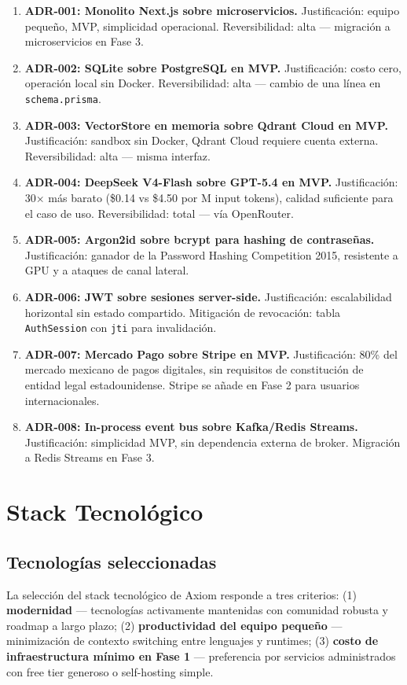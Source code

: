 \documentclass[10pt,a4paper,oneside]{report}
\begin{document}
\begin{enumerate}[leftmargin=1.6em]
\item \textbf{ADR-001: Monolito Next.js sobre microservicios.} Justificación: equipo pequeño, MVP, simplicidad operacional. Reversibilidad: alta — migración a microservicios en Fase 3.
\item \textbf{ADR-002: SQLite sobre PostgreSQL en MVP.} Justificación: costo cero, operación local sin Docker. Reversibilidad: alta — cambio de una línea en \texttt{schema.prisma}.
\item \textbf{ADR-003: VectorStore en memoria sobre Qdrant Cloud en MVP.} Justificación: sandbox sin Docker, Qdrant Cloud requiere cuenta externa. Reversibilidad: alta — misma interfaz.
\item \textbf{ADR-004: DeepSeek V4-Flash sobre GPT-5.4 en MVP.} Justificación: 30× más barato (\$0.14 vs \$4.50 por M input tokens), calidad suficiente para el caso de uso. Reversibilidad: total — vía OpenRouter.
\item \textbf{ADR-005: Argon2id sobre bcrypt para hashing de contraseñas.} Justificación: ganador de la Password Hashing Competition 2015, resistente a GPU y a ataques de canal lateral.
\item \textbf{ADR-006: JWT sobre sesiones server-side.} Justificación: escalabilidad horizontal sin estado compartido. Mitigación de revocación: tabla \texttt{AuthSession} con \texttt{jti} para invalidación.
\item \textbf{ADR-007: Mercado Pago sobre Stripe en MVP.} Justificación: 80\% del mercado mexicano de pagos digitales, sin requisitos de constitución de entidad legal estadounidense. Stripe se añade en Fase 2 para usuarios internacionales.
\item \textbf{ADR-008: In-process event bus sobre Kafka/Redis Streams.} Justificación: simplicidad MVP, sin dependencia externa de broker. Migración a Redis Streams en Fase 3.
\end{enumerate}

\chapter{Stack Tecnológico}

\section{Tecnologías seleccionadas}
La selección del stack tecnológico de Axiom responde a tres criterios: (1) \textbf{modernidad} — tecnologías activamente mantenidas con comunidad robusta y roadmap a largo plazo; (2) \textbf{productividad del equipo pequeño} — minimización de contexto switching entre lenguajes y runtimes; (3) \textbf{costo de infraestructura mínimo en Fase 1} — preferencia por servicios administrados con free tier generoso o self-hosting simple.
\end{document}
